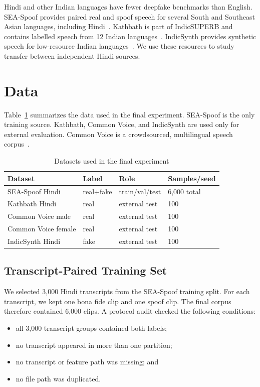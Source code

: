 \documentclass[conference]{IEEEtran}
\begin{document}
Hindi and other Indian languages have fewer deepfake benchmarks than
English. SEA-Spoof provides paired real and spoof speech for several South
and Southeast Asian languages, including Hindi~\cite{wu2025seaspoof}.
Kathbath is part of IndicSUPERB and contains labelled speech from 12 Indian
languages~\cite{javed2022indicsuperb}. IndicSynth provides synthetic speech
for low-resource Indian languages~\cite{sharma2025indicsynth}. We use these
resources to study transfer between independent Hindi sources.

\section{Data}
Table~\ref{tab:data} summarizes the data used in the final experiment.
SEA-Spoof is the only training source. Kathbath, Common Voice, and IndicSynth
are used only for external evaluation. Common Voice is a crowdsourced,
multilingual speech corpus~\cite{ardila2020commonvoice}.

\begin{table}[t]
\caption{Datasets used in the final experiment}
\label{tab:data}
\centering
\small
\begin{tabular}{llll}
\toprule
Dataset & Label & Role & Samples/seed \\
\midrule
SEA-Spoof Hindi & real+fake & train/val/test & 6,000 total \\
Kathbath Hindi & real & external test & 100 \\
Common Voice male & real & external test & 100 \\
Common Voice female & real & external test & 100 \\
IndicSynth Hindi & fake & external test & 100 \\
\bottomrule
\end{tabular}
\end{table}

\subsection{Transcript-Paired Training Set}
We selected 3,000 Hindi transcripts from the SEA-Spoof training split. For
each transcript, we kept one bona fide clip and one spoof clip. The final
corpus therefore contained 6,000 clips. A protocol audit checked the
following conditions:
\begin{itemize}
    \item all 3,000 transcript groups contained both labels;
    \item no transcript appeared in more than one partition;
    \item no transcript or feature path was missing; and
    \item no file path was duplicated.
\end{itemize}
\end{document}
